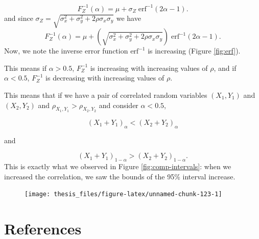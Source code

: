 \documentclass[12pt,twoside]{smiththesis}
\begin{document}
\[F_Z^{-1}(\alpha)=\mu +\sigma_Z \; \text{erf}^{-1}(2\alpha - 1).\]
and since \(\sigma_Z=\sqrt{\sigma_x^2 +\sigma_y^2 + 2 \rho \sigma_x \sigma_y }\) we have
\[F_Z^{-1}(\alpha)=\mu + \left(\sqrt{\sigma_x^2 +\sigma_y^2 + 2 \rho \sigma_x \sigma_y } \right) \; \text{erf}^{-1}(2\alpha - 1).\]
Now, we note the inverse error function \(\text{erf}^{-1}\) is increasing (Figure \ref{fig:erf}).

This means if \(\alpha > 0.5\), \(F_Z^{-1}\) is increasing with increasing values of \(\rho\), and if \(\alpha < 0.5\), \(F_Z^{-1}\) is decreasing with increasing values of \(\rho\).

This means that if we have a pair of correlated random variables \((X_1,Y_1)\) and \((X_2,Y_2)\) and \(\rho_{X_1,Y_1} > \rho_{X_2,Y_2}\) and consider \(\alpha < 0.5\),

\[(X_1+Y_1)_\alpha <(X_2+Y_2)_\alpha\]

and

\[(X_1+Y_1)_{1-\alpha} > (X_2+Y_2)_{1-\alpha}.\]
This is exactly what we observed in Figure \ref{fig:comp-intervals}: when we increased the correlation, we saw the bounds of the 95\% interval increase.
\begin{figure}

{\centering \texttt{[image: thesis\_files/figure-latex/unnamed-chunk-123-1]} 

}

\caption{\label{fig:erf}}\label{fig:unnamed-chunk-123}
\end{figure}
\backmatter

\hypertarget{references}{%
\chapter*{References}\label{references}}


\noindent

\setlength{\parindent}{-0.20in}
\setlength{\leftskip}{0.20in}
\setlength{\parskip}{8pt}
\end{document}
